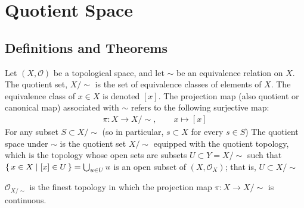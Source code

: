 \chapter{Quotient Space}
\section{Definitions and Theorems}
\begin{defbox}
    \begin{definition}
        Let \((X, \mathcal{O})\) be a {\color{mathif}topological space}, and let \(\sim\) be an {\color{mathif}equivalence relation} on \(X\). The {\color{maththen}quotient set}, \(X / \sim\) is the {\color{mathobj}set} of {\color{mathobj}equivalence classes} of elements of \(X\). The equivalence class of \(x \in X\) is {\color{mathrem}denoted} \([x]\). The {\color{maththen}projection map} (also {\color{mathrem}quotient} or {\color{mathrem}canonical map}) associated with \(\sim\) refers to the following {\color{mathif}surjective map}:
        \begin{align*}
            \pi: X \longrightarrow X / \sim, \qquad x \mapsto [x]
        \end{align*}
        For any subset \(S \subset X / \sim\) (so in particular, \(s \subset X\) for every \(s \in S\))
        The quotient space under \(\sim\) is the quotient set \(X / \sim\) equipped with the quotient topology, which is the topology whose open sets are subsets \(U \subset Y = X / \sim\) such that \(\left\{\, x \in X \mid [x] \in U \,\right\} = \bigcup_{u \in U}u\) is an open subset of \((X, \mathcal{O}_X)\); that is, \(U \subset X / \sim\)
    \end{definition}
\end{defbox}
\begin{thmbox}
    \begin{proposition}
        \(\mathcal{O}_{X / \sim}\) is the {\color{maththen}finest} {\color{mathobj}topology} in which the {\color{mathif}projection map} \(\pi: X \longrightarrow X / \sim\) is {\color{mathif}continuous}.
    \end{proposition}
\end{thmbox}
